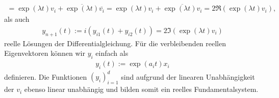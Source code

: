 \begin{solution}
\begin{itemize}
\begin{align*}
    = \exp(\lambda t)v_i + \overline{\exp(\lambda t)}\overline{v_i}
    = \exp(\lambda t)v_i + \overline{\exp(\lambda t)v_i}
    = 2\mathfrak{R}(\exp(\lambda t)v_i),
  \end{align*}
  als auch
  \begin{align*}
    y_{n+1}(t) := i(y_{i1}(t) + y_{i2}(t)) = 2\mathfrak{I}(\exp(\lambda t)v_i)
  \end{align*}
  reelle Lösungen der Differentialgleichung.
  Für die verbleibenden reellen Eigenvektoren können wir $y_i$ einfach als
  \begin{align*}
    y_i(t) := \exp(a_i t)x_i
  \end{align*}
  definieren.
  Die Funktionen $(y_i)_{i=1}^d$ sind aufgrund der linearen Unabhängigkeit der $v_i$
  ebenso linear unabhängig und
  bilden somit ein reelles Fundamentalsystem.
\end{itemize}
\end{solution}
